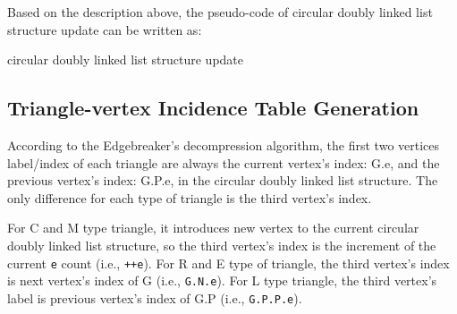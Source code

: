 \documentclass[onecolumn, 12pt]{article}
\begin{document}
{Based on the description above, the pseudo-code of circular doubly linked list structure update can be written as:

\begin{algorithm}[H]
\caption{circular doubly linked list structure update}
\begin{algorithmic}[1]
    \ENDFOR
\ENDIF
\end{algorithmic}
\end{algorithm}


\subsection{Triangle-vertex Incidence Table Generation} \label{Sec:TVtable}
According to the Edgebreaker's decompression algorithm, the first two vertices label/index of each triangle are always the current vertex's index: G.e, and the previous vertex's index: G.P.e, in the circular doubly linked list structure. The only difference for each type of triangle is the third vertex's index.

For C and M type triangle, it introduces new vertex to the current circular doubly linked list structure, so the third vertex's index is the increment of the current \lstinline!e! count (i.e., \lstinline!++e!). For R and E type of triangle, the third vertex's index is next vertex's index of G (i.e., \lstinline!G.N.e!). For L type triangle, the third vertex's label is previous vertex's index of G.P (i.e., \lstinline!G.P.P.e!).

}
\end{document}
